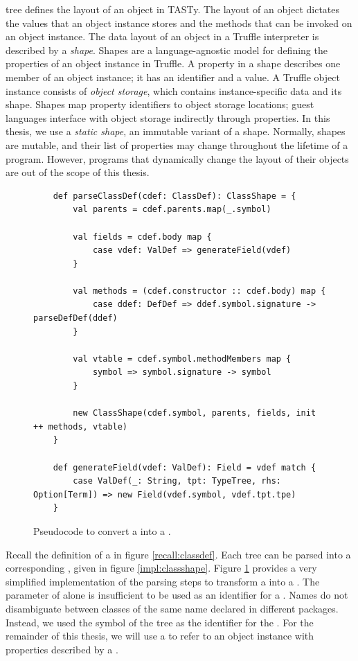  tree defines the layout of an object in TASTy.
The layout of an object dictates the values that an object instance stores and the methods that can be invoked on an object instance.
The data layout of an object in a Truffle interpreter is described by a \textit{shape}\cite{self:prototypes}\cite{truffle:object-model}.
Shapes are a language-agnostic model for defining the properties of an object instance in Truffle.
A property in a shape describes one member of an object instance; it has an identifier and a value.
A Truffle object instance consists of \textit{object storage}, which contains instance-specific data and its shape.
Shapes map property identifiers to object storage locations; guest languages interface with object storage indirectly through properties.
In this thesis, we use a \textit{static shape}, an immutable variant of a shape.
Normally, shapes are mutable, and their list of properties may change throughout the lifetime of a program\cite{truffleruby:object-model}.
However, programs that dynamically change the layout of their objects\cite{java:reflection} are out of the scope of this thesis.

\begin{figure}[!htb]
	\begin{verbatim}
	def parseClassDef(cdef: ClassDef): ClassShape = {
		val parents = cdef.parents.map(_.symbol)
		
		val fields = cdef.body map {
			case vdef: ValDef => generateField(vdef)	
		}
		
		val methods = (cdef.constructor :: cdef.body) map {
			case ddef: DefDef => ddef.symbol.signature -> parseDefDef(ddef)
		}
		
		val vtable = cdef.symbol.methodMembers map {
			symbol => symbol.signature -> symbol
		}
	
		new ClassShape(cdef.symbol, parents, fields, init ++ methods, vtable)
	}

	def generateField(vdef: ValDef): Field = vdef match {
		case ValDef(_: String, tpt: TypeTree, rhs: Option[Term]) => new Field(vdef.symbol, vdef.tpt.tpe)
	}
	\end{verbatim}
	\caption{Pseudocode to convert a  into a .}
	\label{impl:parse-classdef}
\end{figure}

Recall the definition of a  in figure \ref{recall:classdef}.
Each  tree can be parsed into a corresponding , given in figure \ref{impl:classshape}.
Figure \ref{impl:parse-classdef} provides a very simplified implementation of the parsing steps to transform a  into a .
The  parameter of  alone is insufficient to be used as an identifier for a .
Names do not disambiguate between classes of the same name declared in different packages.
Instead, we used the symbol of the  tree as the identifier for the .
For the remainder of this thesis, we will use a  to refer to an object instance with properties described by a .

